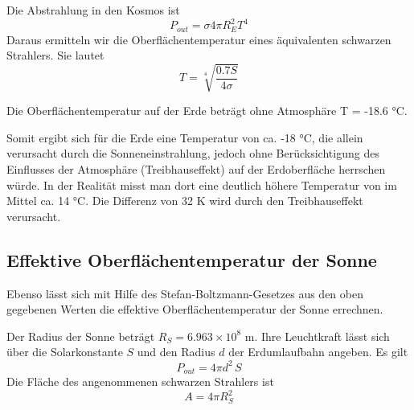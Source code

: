 \documentclass[
  a4paper,
  DIV=11]{scrreprt}
\newenvironment{Shaded}{\begin{snugshade}}{\end{snugshade}}
\newcommand{\FloatTok}[1]{\textcolor[rgb]{0.68,0.00,0.00}{#1}}
\newcommand{\FunctionTok}[1]{\textcolor[rgb]{0.28,0.35,0.67}{#1}}
\newcommand{\NormalTok}[1]{\textcolor[rgb]{0.00,0.23,0.31}{#1}}
\newcommand{\OperatorTok}[1]{\textcolor[rgb]{0.37,0.37,0.37}{#1}}
\newcommand{\SpecialCharTok}[1]{\textcolor[rgb]{0.37,0.37,0.37}{#1}}
\newcommand{\StringTok}[1]{\textcolor[rgb]{0.13,0.47,0.30}{#1}}
\begin{document}
Die Abstrahlung in den Kosmos ist \[
P_{out} = \sigma 4 \pi R_E^2 T^4
\] Daraus ermitteln wir die Oberflächentemperatur eines äquivalenten
schwarzen Strahlers. Sie lautet \[
T = \sqrt[4]{\frac{0.7 S}{4 \sigma}}
\]

\begin{Shaded}
\end{Shaded}

Die Oberflächentemperatur auf der Erde beträgt ohne Atmosphäre T = -18.6
°C.

Somit ergibt sich für die Erde eine Temperatur von ca. -18 °C, die
allein verursacht durch die Sonneneinstrahlung, jedoch ohne
Berücksichtigung des Einflusses der Atmosphäre (Treibhauseffekt) auf der
Erdoberfläche herrschen würde. In der Realität misst man dort eine
deutlich höhere Temperatur von im Mittel ca. 14 °C. Die Differenz von 32
K wird durch den Treibhauseffekt verursacht.

\hypertarget{effektive-oberfluxe4chentemperatur-der-sonne}{%
\subsection{Effektive Oberflächentemperatur der
Sonne}\label{effektive-oberfluxe4chentemperatur-der-sonne}}

Ebenso lässt sich mit Hilfe des Stefan-Boltzmann-Gesetzes aus den oben
gegebenen Werten die effektive Oberflächentemperatur der Sonne
errechnen.

Der Radius der Sonne beträgt \(R_S = 6.963 \times 10^8\) m. Ihre
Leuchtkraft lässt sich über die Solarkonstante \(S\) und den Radius
\(d\) der Erdumlaufbahn angeben. Es gilt \[
P_{out} = 4 \pi d^2 \, S
\] Die Fläche des angenommenen schwarzen Strahlers ist \[
A = 4 \pi R_S^2
\]
\end{document}
